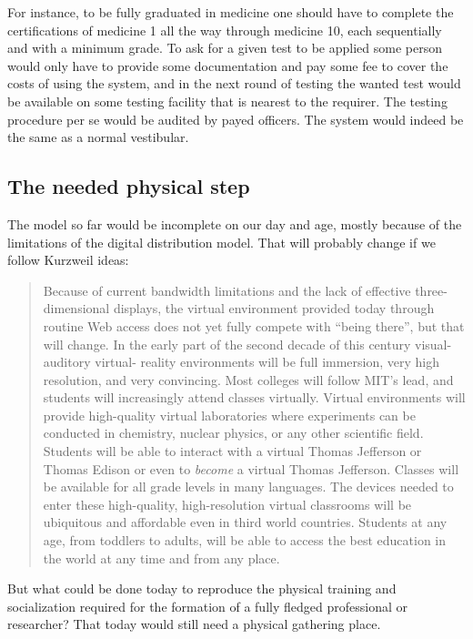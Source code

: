 For instance, to be fully graduated in medicine one should have to complete the
certifications of medicine 1 all the way through medicine 10, each sequentially
and with a minimum grade. To ask for a given test to be applied some person
would only have to provide some documentation and pay some fee to cover the
costs of using the system, and in the next round of testing the wanted test
would be available on some testing facility that is nearest to the requirer. The
testing procedure per se would be audited by payed officers. The system would
indeed be the same as a normal vestibular.


\subsection{The needed physical step}

The model so far would be incomplete on our day and age, mostly because of the
limitations of the digital distribution model. That will probably change if we
follow Kurzweil ideas:

\begin{quotation}
    Because of current bandwidth limitations and the lack of effective
    three-dimensional displays, the virtual environment provided today through
    routine Web access does not yet fully compete with ``being there'', but that
    will change. In the early part of the second decade of this century
    visual-auditory virtual- reality environments will be full immersion, very
    high resolution, and very convincing. Most colleges will follow MIT's lead,
    and students will increasingly attend classes virtually. Virtual
    environments will provide high-quality virtual laboratories where
    experiments can be conducted in chemistry, nuclear physics, or any other
    scientific field. Students will be able to interact with a virtual Thomas
    Jefferson or Thomas Edison or even to \textit{become} a virtual Thomas
    Jefferson. Classes will be available for all grade levels in many languages.
    The devices needed to enter these high-quality, high-resolution virtual
    classrooms will be ubiquitous and affordable even in third world countries.
    Students at any age, from toddlers to adults, will be able to access the
    best education in the world at any time and from any place.
    \cite{futurism:kurzweil_singularity_is_near} 
\end{quotation}

But what could be done today to reproduce the physical training and
socialization required for the formation of a fully fledged professional or
researcher? That today would still need a physical gathering place. 

